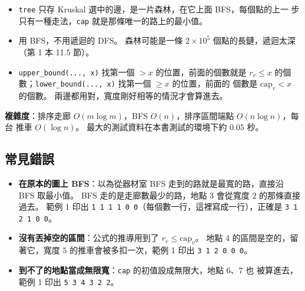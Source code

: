 
\begin{itemize}
\item \texttt{tree} 只存 Kruskal 選中的邊，是一片森林，在它上面 BFS，每個點的上一
步只有一種走法，\texttt{cap} 就是那條唯一的路上的最小值。
\item 用 BFS，不用遞迴的 DFS。 森林可能是一條 $2 \times 10^5$ 個點的長鏈，遞迴太深
（第 1 本 11.5 節）。
\item \texttt{upper\_bound(..., x)} 找第一個 $> x$ 的位置，前面的個數就是
$r_v \le x$ 的個數；\texttt{lower\_bound(..., x)} 找第一個 $\ge x$ 的位置，前面的
個數是 $\mathrm{cap}_v < x$ 的個數。 兩邊都用對，寬度剛好相等的情況才會算進去。
\end{itemize}

\textbf{複雜度}：排序走廊 $O(m \log m)$，BFS $O(n)$，排序區間端點 $O(n \log n)$，每台
推車 $O(\log n)$。 最大的測試資料在本書測試的環境下約 $0.05$ 秒。

\subsection{常見錯誤}

\begin{itemize}
\item \textbf{在原本的圖上 BFS}：以為從器材室 BFS 走到的路就是最寬的路，直接沿 BFS
取最小值。 BFS 走的是走廊數最少的路，地點 3 會從寬度 $2$ 的那條直接過去。 範例 1
印出 \texttt{1 1 1 1 0 0}（每個數一行，這裡寫成一行），正確是
\texttt{3 1 2 1 0 0}。
\item \textbf{沒有丟掉空的區間}：公式的推導用到了 $r_v \le \mathrm{cap}_v$。 地點 4
的區間是空的，留著它，寬度 $5$ 的推車會被多扣一次，範例 1 印出
\texttt{3 1 2 0 0 0}。
\item \textbf{到不了的地點當成無限寬}：\texttt{cap} 的初值設成無限大，地點 6、7 也
被算進去，範例 1 印出 \texttt{5 3 4 3 2 2}。
\end{itemize}

